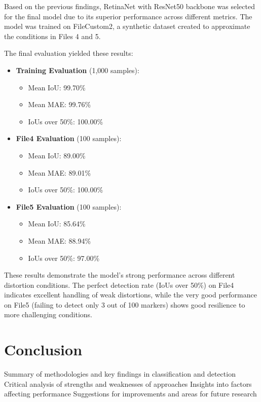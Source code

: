 \documentclass[conference]{IEEEtran}
\begin{document}
Based on the previous findings, RetinaNet with ResNet50 backbone was selected for the final model due to its superior performance
across different metrics. The model was trained on FileCustom2, a synthetic dataset created to approximate the conditions
in Files 4 and 5.

The final evaluation yielded these results:

\begin{itemize}
    \item \textbf{Training Evaluation} (1,000 samples):
        \begin{itemize}
            \item Mean IoU: 99.70\%
            \item Mean MAE: 99.76\%
            \item IoUs over 50\%: 100.00\%
        \end{itemize}
    \item \textbf{File4 Evaluation} (100 samples):
        \begin{itemize}
            \item Mean IoU: 89.00\%
            \item Mean MAE: 89.01\%
            \item IoUs over 50\%: 100.00\%
        \end{itemize}
    \item \textbf{File5 Evaluation} (100 samples):
        \begin{itemize}
            \item Mean IoU: 85.64\%
            \item Mean MAE: 88.94\%
            \item IoUs over 50\%: 97.00\%
        \end{itemize}
\end{itemize}

These results demonstrate the model's strong performance across different distortion conditions.
The perfect detection rate (IoUs over 50\%) on File4 indicates excellent handling of weak distortions,
while the very good performance on File5 (failing to detect only 3 out of 100 markers) shows good resilience
to more challenging conditions.

\section{Conclusion}

Summary of methodologies and key findings in classification and detection
Critical analysis of strengths and weaknesses of approaches
Insights into factors affecting performance
Suggestions for improvements and areas for future research
\end{document}
